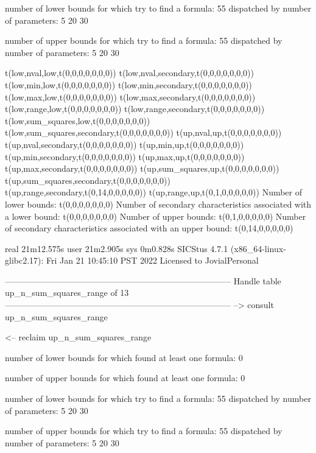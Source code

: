 number of lower bounds for which try to find a formula: 55
dispatched by number of parameters: 5  20  30

number of upper bounds for which try to find a formula: 55
dispatched by number of parameters: 5  20  30

t(low,nval,low,t(0,0,0,0,0,0,0))
t(low,nval,secondary,t(0,0,0,0,0,0,0))
t(low,min,low,t(0,0,0,0,0,0,0))
t(low,min,secondary,t(0,0,0,0,0,0,0))
t(low,max,low,t(0,0,0,0,0,0,0))
t(low,max,secondary,t(0,0,0,0,0,0,0))
t(low,range,low,t(0,0,0,0,0,0,0))
t(low,range,secondary,t(0,0,0,0,0,0,0))
t(low,sum_squares,low,t(0,0,0,0,0,0,0))
t(low,sum_squares,secondary,t(0,0,0,0,0,0,0))
t(up,nval,up,t(0,0,0,0,0,0,0))
t(up,nval,secondary,t(0,0,0,0,0,0,0))
t(up,min,up,t(0,0,0,0,0,0,0))
t(up,min,secondary,t(0,0,0,0,0,0,0))
t(up,max,up,t(0,0,0,0,0,0,0))
t(up,max,secondary,t(0,0,0,0,0,0,0))
t(up,sum_squares,up,t(0,0,0,0,0,0,0))
t(up,sum_squares,secondary,t(0,0,0,0,0,0,0))
t(up,range,secondary,t(0,14,0,0,0,0,0))
t(up,range,up,t(0,1,0,0,0,0,0))
Number of lower bounds:                                             t(0,0,0,0,0,0,0)
Number of secondary characteristics associated with a lower bound:  t(0,0,0,0,0,0,0)
Number of upper bounds:                                             t(0,1,0,0,0,0,0)
Number of secondary characteristics associated with an upper bound: t(0,14,0,0,0,0,0)

real	21m12.575s
user	21m2.905s
sys	0m0.828s
SICStus 4.7.1 (x86_64-linux-glibc2.17): Fri Jan 21 10:45:10 PST 2022
Licensed to JovialPersonal


--------------------------------------------------------------------------------
Handle table up_n_sum_squares_range of 13
--------------------------------------------------------------------------------
--> consult up_n_sum_squares_range

<-- reclaim up_n_sum_squares_range

number of lower bounds for which found at least one formula: 0

number of upper bounds for which found at least one formula: 0

number of lower bounds for which try to find a formula: 55
dispatched by number of parameters: 5  20  30

number of upper bounds for which try to find a formula: 55
dispatched by number of parameters: 5  20  30

